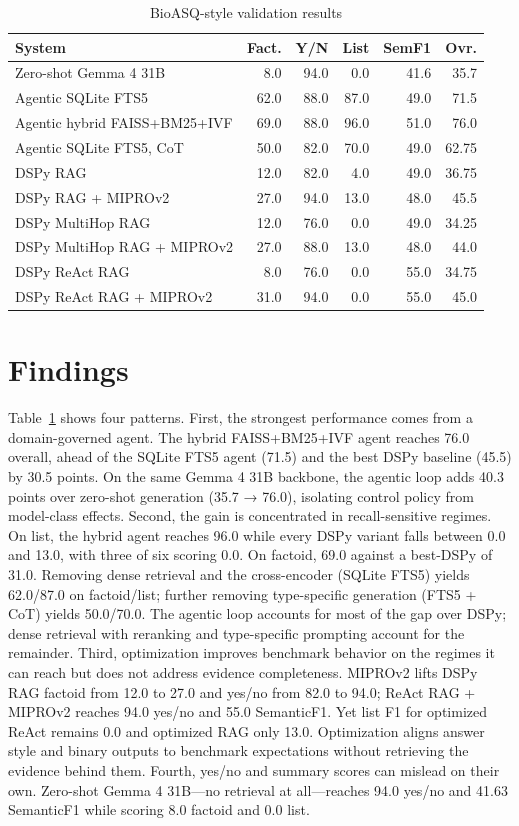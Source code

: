 \documentclass[sigconf,anonymous,review]{acmart}
\begin{document}
\begin{table}[t]
\caption{BioASQ-style validation results}
\label{tab:results}
\small
\begin{tabular}{lrrrrr}
\toprule
System & Fact. & Y/N & List & SemF1 & Ovr. \\
\midrule
Zero-shot Gemma 4 31B & 8.0 & 94.0 & 0.0 & 41.6 & 35.7 \\
Agentic SQLite FTS5 & 62.0 & 88.0 & 87.0 & 49.0 & 71.5 \\
Agentic hybrid FAISS+BM25+IVF & 69.0 & 88.0 & 96.0 & 51.0 & 76.0 \\
Agentic SQLite FTS5, CoT & 50.0 & 82.0 & 70.0 & 49.0 & 62.75 \\
\midrule
DSPy RAG & 12.0 & 82.0 & 4.0 & 49.0 & 36.75 \\
DSPy RAG + MIPROv2 & 27.0 & 94.0 & 13.0 & 48.0 & 45.5 \\
DSPy MultiHop RAG & 12.0 & 76.0 & 0.0 & 49.0 & 34.25 \\
DSPy MultiHop RAG + MIPROv2 & 27.0 & 88.0 & 13.0 & 48.0 & 44.0 \\
DSPy ReAct RAG & 8.0 & 76.0 & 0.0 & 55.0 & 34.75 \\
DSPy ReAct RAG + MIPROv2 & 31.0 & 94.0 & 0.0 & 55.0 & 45.0 \\
\bottomrule
\end{tabular}
\end{table}

\section{Findings}

Table~\ref{tab:results} shows four patterns. First, the strongest performance comes
from a domain-governed agent. The hybrid FAISS+BM25+IVF agent
reaches 76.0 overall, ahead of the SQLite FTS5 agent (71.5) and the
best DSPy baseline (45.5) by 30.5 points. On the same Gemma 4
31B backbone, the agentic loop adds 40.3 points over zero-shot
generation (35.7 → 76.0), isolating control policy from model-class
effects. Second, the gain is concentrated in recall-sensitive regimes.
On list, the hybrid agent reaches 96.0 while every DSPy variant
falls between 0.0 and 13.0, with three of six scoring 0.0. On factoid,
69.0 against a best-DSPy of 31.0. Removing dense retrieval and the
cross-encoder (SQLite FTS5) yields 62.0/87.0 on factoid/list; further
removing type-specific generation (FTS5 + CoT) yields 50.0/70.0.
The agentic loop accounts for most of the gap over DSPy; dense
retrieval with reranking and type-specific prompting account for
the remainder. Third, optimization improves benchmark behavior
on the regimes it can reach but does not address evidence completeness. MIPROv2 lifts DSPy RAG factoid from 12.0 to 27.0 and yes/no
from 82.0 to 94.0; ReAct RAG + MIPROv2 reaches 94.0 yes/no and
55.0 SemanticF1. Yet list F1 for optimized ReAct remains 0.0 and optimized RAG only 13.0. Optimization aligns answer style and binary
outputs to benchmark expectations without retrieving the evidence
behind them. Fourth, yes/no and summary scores can mislead on
their own. Zero-shot Gemma 4 31B—no retrieval at all—reaches
94.0 yes/no and 41.63 SemanticF1 while scoring 8.0 factoid and 0.0
list.
\end{document}
